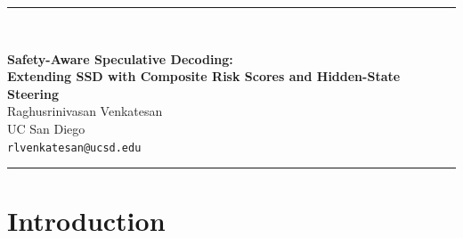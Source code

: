 \documentclass[11pt,a4paper]{article}
\begin{document}
\noindent\rule{\textwidth}{1.5pt}\\[1em]
\begin{center}
  {\sffamily\bfseries\LARGE Safety-Aware Speculative Decoding:\\
  Extending SSD with Composite Risk Scores and Hidden-State Steering}\\[1.5em]
  Raghusrinivasan Venkatesan\\
  UC San Diego\\
  \texttt{rlvenkatesan@ucsd.edu}\\
\end{center}
\vspace{0.5em}
\noindent\rule{\textwidth}{1.5pt}
\vspace{1em}

\begin{abstract}
\noindent
Large language models (LLMs) remain vulnerable to jailbreak attacks despite alignment. We build on \emph{Speculative Safety-Aware Decoding} (SSD), which uses a small safety-conscious draft model and match-ratio-based mode switching to improve safety and inference speed. We extend SSD along three directions: (1) a \emph{Composite Risk Score} (CRS) that replaces coarse binary switching with a per-token continuous risk signal combining match mismatch, KL divergence, entropy gap, and refusal-token mass; (2) \emph{hidden-state steering} that injects the target model's refusal-aligned representations into the draft, with injection scale modulated by CRS; and (3) integration with \emph{Alignment-Augmented Speculative Decoding} (AASD) for KV-cached generation and alignment sampling. We also add training-free extensions: contrastive system prompts and perplexity-gated early Union mode. On a custom high-ASR evaluation set (70 harmful, 30 benign prompts), CRS alone reduces attack success rate (ASR) by 30.7 percentage points versus vanilla; CRS combined with steering achieves \textbf{1.8\%} overall ASR and halves DeepInception ASR (40\% $\to$ 20\%) with minimal over-refusal (3.3\%). We ablate CRS vs.\ steering and discuss failure modes on template-based jailbreaks.
\end{abstract}

\section{Introduction}
\label{sec:intro}
\end{document}
